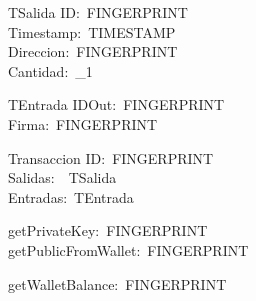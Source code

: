 \begin{schema}{TSalida}
ID:~FINGERPRINT\\
Timestamp:~TIMESTAMP\\
Direccion:~FINGERPRINT\\
Cantidad:~\nat_1\\
\end{schema}
\begin{schema}{TEntrada}
IDOut:~FINGERPRINT\\
Firma:~FINGERPRINT\\
\end{schema}
\begin{schema}{Transaccion}
ID:~FINGERPRINT\\
Salidas:~\power~TSalida\\
Entradas:~\power TEntrada\\
\end{schema}
\begin{axdef}
getPrivateKey:~FINGERPRINT\\
getPublicFromWallet:~FINGERPRINT\\
\end{axdef}
\begin{axdef}
getWalletBalance:~FINGERPRINT~\fun~\integer\\
\end{axdef}
